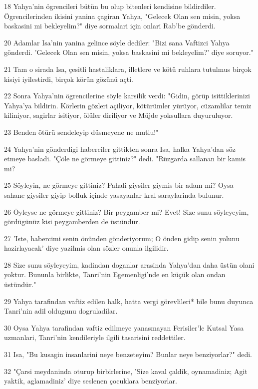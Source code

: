 \par 18 Yahya'nin ögrencileri bütün bu olup bitenleri kendisine bildirdiler. Ögrencilerinden ikisini yanina çagiran Yahya, "Gelecek Olan sen misin, yoksa baskasini mi bekleyelim?" diye sormalari için onlari Rab'be gönderdi.
\par 20 Adamlar Isa'nin yanina gelince söyle dediler: "Bizi sana Vaftizci Yahya gönderdi. 'Gelecek Olan sen misin, yoksa baskasini mi bekleyelim?' diye soruyor."
\par 21 Tam o sirada Isa, çesitli hastaliklara, illetlere ve kötü ruhlara tutulmus birçok kisiyi iyilestirdi, birçok körün gözünü açti.
\par 22 Sonra Yahya'nin ögrencilerine söyle karsilik verdi: "Gidin, görüp isittiklerinizi Yahya'ya bildirin. Körlerin gözleri açiliyor, kötürümler yürüyor, cüzamlilar temiz kiliniyor, sagirlar isitiyor, ölüler diriliyor ve Müjde yoksullara duyuruluyor.
\par 23 Benden ötürü sendeleyip düsmeyene ne mutlu!"
\par 24 Yahya'nin gönderdigi haberciler gittikten sonra Isa, halka Yahya'dan söz etmeye basladi. "Çöle ne görmeye gittiniz?" dedi. "Rüzgarda sallanan bir kamis mi?
\par 25 Söyleyin, ne görmeye gittiniz? Pahali giysiler giymis bir adam mi? Oysa sahane giysiler giyip bolluk içinde yasayanlar kral saraylarinda bulunur.
\par 26 Öyleyse ne görmeye gittiniz? Bir peygamber mi? Evet! Size sunu söyleyeyim, gördügünüz kisi peygamberden de üstündür.
\par 27 'Iste, habercimi senin önünden gönderiyorum; O önden gidip senin yolunu hazirlayacak' diye yazilmis olan sözler onunla ilgilidir.
\par 28 Size sunu söyleyeyim, kadindan doganlar arasinda Yahya'dan daha üstün olani yoktur. Bununla birlikte, Tanri'nin Egemenligi'nde en küçük olan ondan üstündür."
\par 29 Yahya tarafindan vaftiz edilen halk, hatta vergi görevlileri* bile bunu duyunca Tanri'nin adil oldugunu dogruladilar.
\par 30 Oysa Yahya tarafindan vaftiz edilmeye yanasmayan Ferisiler'le Kutsal Yasa uzmanlari, Tanri'nin kendileriyle ilgili tasarisini reddettiler.
\par 31 Isa, "Bu kusagin insanlarini neye benzeteyim? Bunlar neye benziyorlar?" dedi.
\par 32 "Çarsi meydaninda oturup birbirlerine, 'Size kaval çaldik, oynamadiniz; Agit yaktik, aglamadiniz' \m diye seslenen çocuklara benziyorlar.
